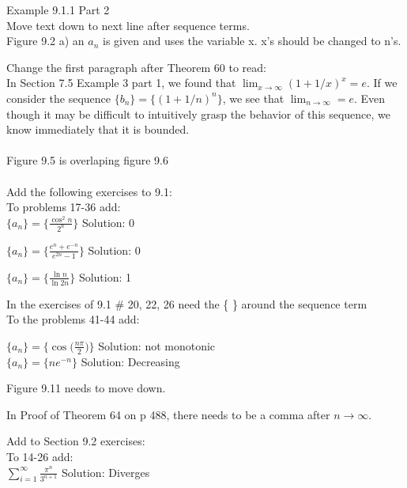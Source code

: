 \documentclass[10pt]{article}
\newcommand{\ds}{\displaystyle}
\begin{document}
Example 9.1.1 Part 2 \\
Move text down to next line after sequence terms.\\

Figure 9.2 a) an $a_n$ is given and uses the variable x. x's should be changed to n's.

Change the first paragraph after Theorem 60 to read:\\

In Section 7.5 Example 3 part 1, we found that $\ds \lim_{x\to \infty} (1+1/x)^x=e$. If we consider the sequence $\ds \{b_n\}=\{(1+1/n)^n\}$, we see that $\ds \lim_{n\to \infty}=e$. Even though it may be difficult to intuitively grasp the behavior of this sequence, we know immediately that it is bounded.  \\ \\


Figure 9.5 is overlaping figure 9.6\\ \\

Add the following exercises to 9.1:\\
	To problems 17-36 add:\\

		$\ds \{a_n\}=\biggl\{\frac{\cos^2 n}{2^n}\biggr\}$		Solution: 0

		$\ds \{a_n\}=\biggl\{\frac{e^n+e^{-n}}{e^{2n}-1}\biggr\}$		Solution: 0

		$\ds \{a_n\}=\biggl\{\frac{\ln n}{\ln 2n}\biggr\}$		Solution: 1

	In the exercises of 9.1  \# 20, 22, 26 need the \{ \} around the sequence term\\

	To the problems 41-44 add:

		$\ds\{a_n\}=\biggl\{\cos \biggl(\frac{n\pi}{2}\biggr)\biggr\}$ 	Solution: not monotonic\\
		
		$\{a_n\}=\{ne^{-n}\}$		Solution: Decreasing



Figure 9.11 needs to move down.

In Proof of Theorem 64 on p 488, there needs to be a comma after $n\to \infty$. 

Add to Section 9.2 exercises: \\

To 14-26 add:\\

$\ds \sum_{i=1}^{\infty} \frac{\pi^n}{3^{n+1}}$ 		Solution: Diverges \\
\end{document}
